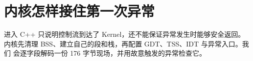 \chapter{内核怎样接住第一次异常}

进入 C++ 只说明控制流到达了 Kernel，还不能保证异常发生时能够安全返回。
内核先清理 BSS、建立自己的段和栈，再配置 GDT、TSS、IDT 与异常入口。我们
会逐字段解码一份 176 字节现场，并用故意触发的异常检查它。





